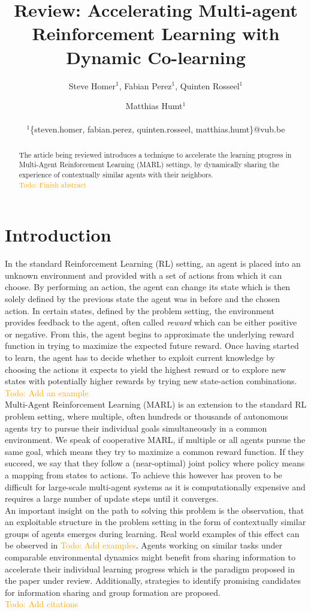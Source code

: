 \documentclass[letterpaper]{article}
\title{Review: Accelerating Multi-agent Reinforcement Learning
with Dynamic Co-learning}
\author{Steve Homer$^1$, Fabian Perez$^1$, Quinten Rosseel$^1$ \and Matthias Humt$^1$ \\
\mbox{}\\
$^1$\{steven.homer, fabian.perez, quinten.rosseel, matthias.humt\}@vub.be}
\newcommand\todo[1]{\textcolor{orange}{Todo: #1}}
\begin{document}
\maketitle

\begin{abstract}
 The article being reviewed introduces a technique to accelerate the learning progress in Multi-Agent Reinforcement Learning (MARL) settings, by dynamically sharing the experience of contextually similar agents with their neighbors.
 \\\todo{Finish abstract}
\end{abstract}

\section{Introduction}
In the standard Reinforcement Learning (RL) setting, an agent is placed into an unknown environment and provided with a set of actions from which it can choose. By performing an action, the agent can change its state which is then solely defined by the previous state the agent was in before and the chosen action. In certain states, defined by the problem setting, the environment provides feedback to the agent, often called \textit{reward} which can be either positive or negative. From this, the agent begins to approximate the underlying reward function in trying to maximize the expected future reward. Once having started to learn, the agent has to decide whether to exploit current knowledge by choosing the actions it expects to yield the highest reward or to explore new states with potentially higher rewards by trying new state-action combinations.
\\\todo{Add an example}\\
Multi-Agent Reinforcement Learning (MARL) is an extension to the standard RL problem setting, where multiple, often hundreds or thousands of autonomous agents try to pursue their individual goals simultaneously in a common environment. We speak of cooperative MARL, if multiple or all agents pursue the same goal, which means they try to maximize a common reward function. If they succeed, we say that they follow a (near-optimal) joint policy where policy means a mapping from states to actions. To achieve this however has proven to be difficult for large-scale multi-agent systems as it is computationally expensive and requires a large number of update steps until it converges.\\
An important insight on the path to solving this problem is the observation, that an exploitable structure in the problem setting in the form of contextually similar groups of agents emerges during learning.
Real world examples of this effect can be observed in \todo{Add examples}. Agents working on similar tasks under comparable environmental dynamics might benefit from sharing information to accelerate their individual learning progress which is the paradigm proposed in the paper under review. Additionally, strategies to identify promising candidates for information sharing and group formation are proposed.
\\\todo{Add citations}
\end{document}
